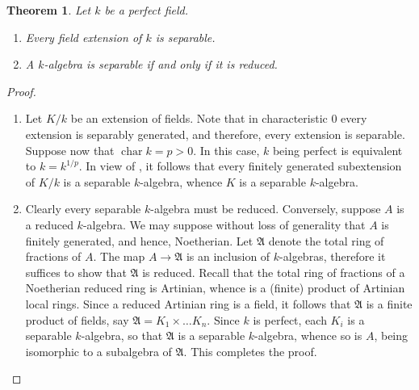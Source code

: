 \documentclass[10pt]{article}
\theoremstyle{thmstyle}
\newtheorem{theorem}{Theorem}[section]
\theoremstyle{defstyle}
\newcommand{\chr}{\operatorname{char}}
\newcommand{\frakA}{\mathfrak{A}}
\begin{document}
\begin{theorem}
    Let $k$ be a perfect field. 
    \begin{enumerate}[label=(\arabic*)]
        \item Every field extension of $k$ is separable. 
        \item A $k$-algebra is separable if and only if it is reduced.
    \end{enumerate}
\end{theorem}
\begin{proof}
\begin{enumerate}[label=(\arabic*)]
    \item Let $K/k$ be an extension of fields. Note that in characteristic $0$ every extension is separably generated, and therefore, every extension is separable. Suppose now that $\chr k = p > 0$. In this case, $k$ being perfect is equivalent to $k = k^{1/p}$. In view of , it follows that every finitely generated subextension of $K/k$ is a separable $k$-algebra, whence $K$ is a separable $k$-algebra. 
    
    \item Clearly every separable $k$-algebra must be reduced. Conversely, suppose $A$ is a reduced $k$-algebra. We may suppose without loss of generality that $A$ is finitely generated, and hence, Noetherian. Let $\mathfrak A$ denote the total ring of fractions of $A$. The map $A\to\mathfrak A$ is an inclusion of $k$-algebras, therefore it suffices to show that $\mathfrak A$ is reduced. Recall that the total ring of fractions of a Noetherian reduced ring is Artinian, whence is a (finite) product of Artinian local rings. Since a reduced Artinian ring is a field, it follows that $\mathfrak A$ is a finite product of fields, say $\frakA = K_1\times\dots K_n$. Since $k$ is perfect, each $K_i$ is a separable $k$-algebra, so that $\frakA$ is a separable $k$-algebra, whence so is $A$, being isomorphic to a subalgebra of $\frakA$. This completes the proof. \qedhere
\end{enumerate}
\end{proof}
\end{document}

